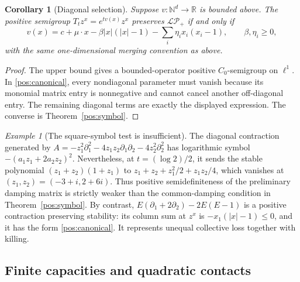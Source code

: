 \documentclass[reqno]{amsart}
\newtheorem{corollary}[theorem]{Corollary}
\theoremstyle{definition}
\theoremstyle{remark}
\newtheorem{example}[theorem]{Example}
\newcommand{\R}{\mathbb R}
\newcommand{\N}{\mathbb N}
\begin{document}
\begin{corollary}[Diagonal selection]\label{pos:diagonal}
Suppose \(v:\N^d\to\R\) is bounded above.  The positive semigroup
\(T_tz^x=e^{tv(x)}z^x\) preserves \(\mathcal{LP}_+\) if and only if
\[
 v(x)=c+\mu\cdot x-\beta|x|(|x|-1)-\sum_i\eta_i x_i(x_i-1),
 \qquad \beta,\eta_i\ge0,
\]
with the same one-dimensional merging convention as above.
\end{corollary}
\begin{proof}
The upper bound gives a bounded-operator positive \(C_0\)-semigroup on \(\ell^1\).
In \eqref{pos:canonical}, every nondiagonal parameter must vanish because its
monomial matrix entry is nonnegative and cannot cancel another off-diagonal
entry.  The remaining diagonal terms are exactly the displayed expression.
The converse is Theorem~\ref{pos:symbol}.
\end{proof}

\begin{example}[The square-symbol test is insufficient]\label{pos:psd-counterexample}
The diagonal contraction generated by
\(A=-z_1^2\partial_1^2-4z_1z_2\partial_1\partial_2-4z_2^2\partial_2^2\)
has logarithmic symbol \(-(a_1z_1+2a_2z_2)^2\).
Nevertheless, at \(t=(\log2)/2\), it sends the stable polynomial
\((z_1+z_2)(1+z_1)\) to
\(z_1+z_2+z_1^2/2+z_1z_2/4\), which vanishes at
\((z_1,z_2)=(-3+i,2+6i)\).
Thus positive semidefiniteness of the preliminary damping matrix is strictly
weaker than the common-damping condition in Theorem~\ref{pos:symbol}.
By contrast, \(E(\partial_1+2\partial_2)-2E(E-1)\) is a positive contraction
preserving stability: its column sum at \(z^x\) is
\(-x_1(|x|-1)\le0\), and it has the form \eqref{pos:canonical}.
It represents unequal collective loss together with killing.
\end{example}

\subsection{Finite capacities and quadratic contacts}
\end{document}
